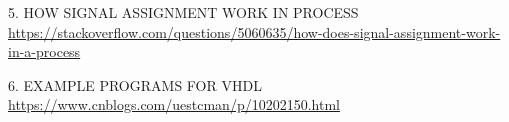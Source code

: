 \documentclass[UTF8]{article}
\begin{document}
5. HOW SIGNAL ASSIGNMENT WORK IN PROCESS \\\url{https://stackoverflow.com/questions/5060635/how-does-signal-assignment-work-in-a-process}


6. EXAMPLE PROGRAMS FOR VHDL \\ \url{https://www.cnblogs.com/uestcman/p/10202150.html}







\end{document}
